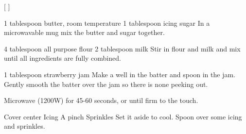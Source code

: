 
[
]

\begin{step}
1 tablespoon butter, room temperature
1 tablespoon icing sugar
\method
In a microwavable mug mix the butter and sugar together.
\end{step}

\begin{step}
4 tablespoon all purpose flour
2 tablespoon milk
\method
Stir in flour and milk and mix until all ingredients are fully combined.
\end{step}

\begin{step}
1 tablespoon strawberry jam
\method
Make a well in the batter and spoon in the jam. Gently smooth the batter over the jam so there is none peeking out.

Microwave (1200W) for 45-60 seconds, or until firm to the touch.
\end{step}

\begin{step}
Cover center Icing
A pinch Sprinkles
\method
Set it aside to cool. Spoon over some icing and sprinkles.
\end{step}